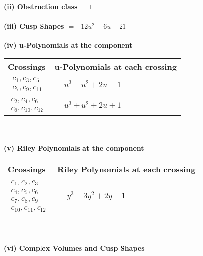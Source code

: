 \documentclass[1p]{elsarticle_modified}
\theoremstyle{definition}
\begin{document}
\flushleft \textbf{(ii) Obstruction class $= 1$}\\~\\
\flushleft \textbf{(iii) Cusp Shapes $= -12 u^2+6 u-21$}\\~\\
\newpage\renewcommand{\arraystretch}{1}
\flushleft \textbf{(iv) u-Polynomials at the component}\newline \\
\begin{tabular}{m{50pt}|m{274pt}}
Crossings & \hspace{64pt}u-Polynomials at each crossing \\
\hline $$\begin{aligned}c_{1},c_{3},c_{5}\\c_{7},c_{9},c_{11}\end{aligned}$$&$\begin{aligned}
&u^3- u^2+2 u-1
\end{aligned}$\\
\hline $$\begin{aligned}c_{2},c_{4},c_{6}\\c_{8},c_{10},c_{12}\end{aligned}$$&$\begin{aligned}
&u^3+u^2+2 u+1
\end{aligned}$\\
\hline
\end{tabular}\\~\\
\newpage\renewcommand{\arraystretch}{1}
\flushleft \textbf{(v) Riley Polynomials at the component}\newline \\
\begin{tabular}{m{50pt}|m{274pt}}
Crossings & \hspace{64pt}Riley Polynomials at each crossing \\
\hline $$\begin{aligned}c_{1},c_{2},c_{3}\\c_{4},c_{5},c_{6}\\c_{7},c_{8},c_{9}\\c_{10},c_{11},c_{12}\end{aligned}$$&$\begin{aligned}
&y^3+3 y^2+2 y-1
\end{aligned}$\\
\hline
\end{tabular}\\~\\
\newpage\flushleft \textbf{(vi) Complex Volumes and Cusp Shapes}
\end{document}
